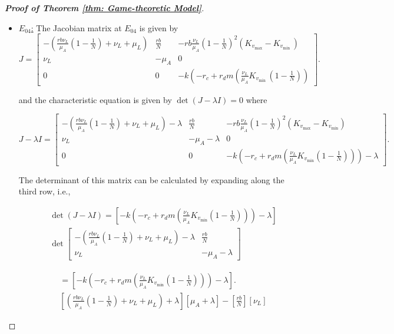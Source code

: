 \documentclass[10pt,a4paper]{amsart}
\begin{document}
\begin{proof}[\textbf{Proof of Theorem \ref{thm: Game-theoretic Model}}]
\begin{itemize}
\item \underline{$E_{04}$:} The Jacobian matrix at $E_{04}$ is given by 
 $$
J=\left[\begin{array}{ccc}
-\left(\frac{r b \nu_L}{\mu_A}\left(1-\frac{1}{{N}}\right)+\nu_L+\mu_L\right) & \frac{r b}{{N}} & -r b \frac{\nu_L}{\mu_A}\left(1-\frac{1}{{N}}\right)^2\left(K_{v_{\max }}-K_{v_{\text {min }}}\right) \\
\nu_L & -\mu_A & 0 \\
0 & 0 & -k\left(-r_c+r_d m\left(\frac{\nu_L}{\mu_A} K_{v_{\text {min }}}\left(1-\frac{1}{{N}}\right)\right)\right.
\end{array}\right].
$$

and the characteristic equation is given by \(\det(J - \lambda I) = 0\) where

\[
J-\lambda I = \left[
\begin{array}{ccc}
-\left(\frac{r b \nu_L}{\mu_A}\left(1 - \frac{1}{{N}}\right) + \nu_L + \mu_L\right) - \lambda 
& \frac{r b}{{N}} 
& -r b \frac{\nu_L}{\mu_A}\left(1 - \frac{1}{{N}}\right)^2\left(K_{v_{\max}} - K_{v_{\min}}\right) \\
\nu_L 
& -\mu_A - \lambda 
& 0 \\
0 
& 0 
& -k\left(-r_c + r_d m \left(\frac{\nu_L}{\mu_A} K_{v_{\min}}\left(1 - \frac{1}{{N}}\right)\right)\right) - \lambda
\end{array}
\right].
\]

The determinant of this matrix can be calculated by expanding along the third row, i.e.,

$$
\begin{aligned}
& \operatorname{det}(J-\lambda I)=\left[-k\left(-r_c+r_d m\left(\frac{\nu_L}{\mu_A} K_{v_{\min }}\left(1-\frac{1}{{N}}\right)\right)\right)-\lambda\right] \\
& \operatorname{det}\left[\begin{array}{cc}
-\left(\frac{r b \nu_L}{\mu_A}\left(1-\frac{1}{{N}}\right)+\nu_L+\mu_L\right)-\lambda & \frac{r b}{{N}} \\
\nu_L & -\mu_A-\lambda
\end{array}\right]
\end{aligned}
$$

$$ 
\begin{aligned}
&=\left[-k\left(-r_c+r_d m\left(\frac{\nu_L}{\mu_A} K_{v_{\min }}\left(1-\frac{1}{{N}}\right)\right)\right)-\lambda\right]. \\
& {\left[\left(\frac{r b \nu_L}{\mu_A}\left(1-\frac{1}{{N}}\right)+\nu_L+\mu_L\right)+\lambda\right]\left[\mu_A+\lambda\right]-\left[\frac{r b}{{N}}\right]\left[\nu_L\right] }
\end{aligned}
$$


\end{itemize}
\end{proof}
\end{document}

